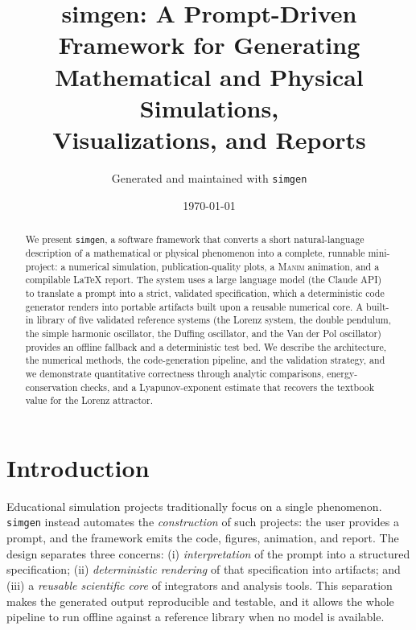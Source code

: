 \documentclass[11pt,a4paper]{article}
\title{\textbf{simgen}: A Prompt-Driven Framework for Generating\\
       Mathematical and Physical Simulations,\\
       Visualizations, and Reports}
\author{Generated and maintained with \texttt{simgen}}
\date{\today}
\begin{document}
\maketitle

\begin{abstract}
We present \texttt{simgen}, a software framework that converts a short
natural-language description of a mathematical or physical phenomenon into a
complete, runnable mini-project: a numerical simulation, publication-quality
plots, a \textsc{Manim} animation, and a compilable \LaTeX{} report. The system
uses a large language model (the Claude API) to translate a prompt into a strict,
validated specification, which a deterministic code generator renders into
portable artifacts built upon a reusable numerical core. A built-in library of
five validated reference systems (the Lorenz system, the double pendulum, the
simple harmonic oscillator, the Duffing oscillator, and the Van der Pol
oscillator) provides an offline fallback and a deterministic test bed. We
describe the architecture, the numerical methods, the code-generation pipeline,
and the validation strategy, and we demonstrate quantitative correctness through
analytic comparisons, energy-conservation checks, and a Lyapunov-exponent
estimate that recovers the textbook value for the Lorenz attractor.
\end{abstract}

\tableofcontents

\section{Introduction}
Educational simulation projects traditionally focus on a single phenomenon.
\texttt{simgen} instead automates the \emph{construction} of such projects: the
user provides a prompt, and the framework emits the code, figures, animation,
and report. The design separates three concerns: (i) \emph{interpretation} of
the prompt into a structured specification; (ii) \emph{deterministic rendering}
of that specification into artifacts; and (iii) a \emph{reusable scientific
core} of integrators and analysis tools. This separation makes the generated
output reproducible and testable, and it allows the whole pipeline to run
offline against a reference library when no model is available.
\end{document}
